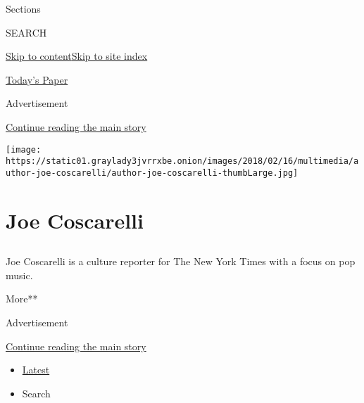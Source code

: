 Sections

SEARCH

\protect\hyperlink{site-content}{Skip to
content}\protect\hyperlink{site-index}{Skip to site index}

\href{https://myaccount.nytimes3xbfgragh.onion/auth/login?response_type=cookie\&client_id=vi}{}

\href{https://www.nytimes3xbfgragh.onion/section/todayspaper}{Today's
Paper}

Advertisement

\protect\hyperlink{after-top}{Continue reading the main story}

\texttt{[image: https://static01.graylady3jvrrxbe.onion/images/2018/02/16/multimedia/author-joe-coscarelli/author-joe-coscarelli-thumbLarge.jpg]}

\hypertarget{joe-coscarelli}{%
\section{Joe Coscarelli}\label{joe-coscarelli}}

\subsection{}

Joe Coscarelli is a culture reporter for The New York Times with a focus
on pop music.

More**

Advertisement

\protect\hyperlink{after-mid1}{Continue reading the main story}

\begin{itemize}
\tightlist
\item
  \protect\hyperlink{stream-panel}{Latest}
\item
  Search
\end{itemize}

